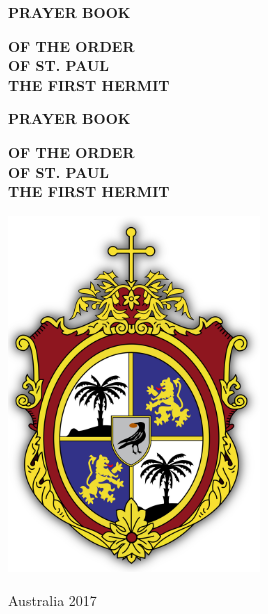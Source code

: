 \pagestyle{empty}

\hspace{0pt}
\vfill

\begin{center}
\uppercase{\textbf{\Large Prayer Book}} \par
\vspace{1em}
\uppercase{\textbf{\normalsize of the Order \\
of St. Paul \\
the First Hermit}} \par
\end{center}

\vfill
\hspace{0pt}

\newpage\null\thispagestyle{empty}\newpage

\hspace{0pt}
\vfill

\begin{center}
\uppercase{\textbf{\huge Prayer Book}} \par
\vspace{1em}
\uppercase{\textbf{\large of the Order\\
of St. Paul \\
the First Hermit}} \par
\end{center}

\begin{center}
\includegraphics[width=0.5\textwidth]{coat-of-arms}
\end{center}

\vfill

\begin{center}
Australia 2017 
\end{center}

